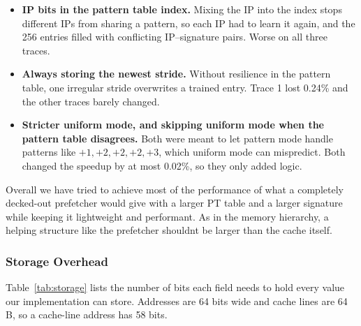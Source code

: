 \documentclass[11pt,a4paper]{article}
\begin{document}
\begin{itemize}
      sometimes blocked useful prefetches, so it was slightly worse on
      all three traces.
    \item \textbf{IP bits in the pattern table index.} Mixing the IP into
      the index stops different IPs from sharing a pattern, so each IP
      had to learn it again, and the 256 entries filled with conflicting
      IP--signature pairs. Worse on all three traces.
    \item \textbf{Always storing the newest stride.} Without resilience
      in the pattern table, one irregular stride overwrites a trained
      entry. Trace 1 lost 0.24\% and the other traces barely changed.
    \item \textbf{Stricter uniform mode, and skipping uniform mode when
      the pattern table disagrees.} Both were meant to let pattern mode
      handle patterns like $+1,+2,+2,+2,+3$, which uniform mode can
      mispredict. Both changed the speedup by at most 0.02\%, so they
      only added logic.
  \end{itemize}

  Overall we have tried to achieve most of the performance of what a completely decked-out prefetcher would give with a larger PT table and a larger signature while keeping it lightweight and performant. As in the memory hierarchy, a helping structure like the prefetcher shouldnt be larger than the cache itself.

  \subsubsection{Storage Overhead}

  Table~\ref{tab:storage} lists the number of bits each field needs to
  hold every value our implementation can store. Addresses are 64 bits
  wide and cache lines are 64\,B, so a cache-line address has 58 bits.
\end{document}
